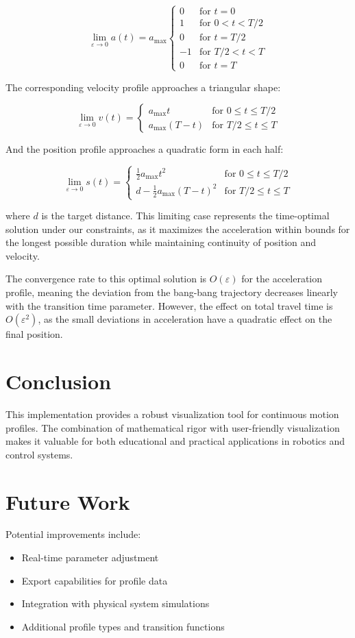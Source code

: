 \documentclass[12pt,a4paper]{article}
\begin{document}
\begin{equation}
\lim_{\varepsilon \to 0} a(t) = a_{\text{max}} \begin{cases}
0 & \text{for } t = 0 \\
1 & \text{for } 0 < t < T/2 \\
0 & \text{for } t = T/2 \\
-1 & \text{for } T/2 < t < T \\
0 & \text{for } t = T
\end{cases}
\end{equation}

The corresponding velocity profile approaches a triangular shape:

\begin{equation}
\lim_{\varepsilon \to 0} v(t) = \begin{cases}
a_{\text{max}}t & \text{for } 0 \leq t \leq T/2 \\
a_{\text{max}}(T-t) & \text{for } T/2 \leq t \leq T
\end{cases}
\end{equation}

And the position profile approaches a quadratic form in each half:

\begin{equation}
\lim_{\varepsilon \to 0} s(t) = \begin{cases}
\frac{1}{2}a_{\text{max}}t^2 & \text{for } 0 \leq t \leq T/2 \\
d - \frac{1}{2}a_{\text{max}}(T-t)^2 & \text{for } T/2 \leq t \leq T
\end{cases}
\end{equation}

where $d$ is the target distance. This limiting case represents the time-optimal solution under our constraints, as it maximizes the acceleration within bounds for the longest possible duration while maintaining continuity of position and velocity.

The convergence rate to this optimal solution is $O(\varepsilon)$ for the acceleration profile, meaning the deviation from the bang-bang trajectory decreases linearly with the transition time parameter. However, the effect on total travel time is $O(\varepsilon^2)$, as the small deviations in acceleration have a quadratic effect on the final position.

\section{Conclusion}
This implementation provides a robust visualization tool for continuous motion profiles. The combination of mathematical rigor with user-friendly visualization makes it valuable for both educational and practical applications in robotics and control systems.

\section{Future Work}
Potential improvements include:
\begin{itemize}
\item Real-time parameter adjustment
\item Export capabilities for profile data
\item Integration with physical system simulations
\item Additional profile types and transition functions
\end{itemize}
\end{document}
